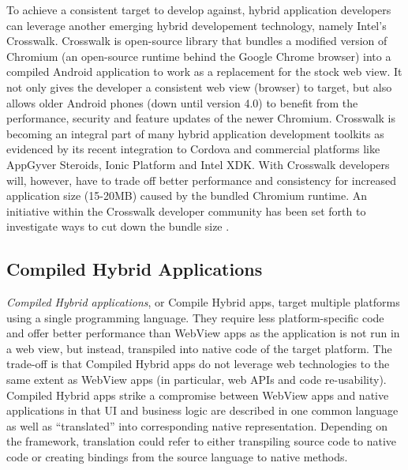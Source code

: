\documentclass[thesis.tex]{subfiles}
\begin{document}
To achieve a consistent target to develop against, hybrid application developers can leverage another emerging hybrid developement technology, namely Intel's Crosswalk. Crosswalk is open-source library that bundles a modified version of Chromium (an open-source runtime behind the Google Chrome browser) into a compiled Android application to work as a replacement for the stock web view. It not only gives the developer a consistent web view (browser) to target, but also allows older Android phones (down until version 4.0) to benefit from the performance, security and feature updates of the newer Chromium. Crosswalk is becoming an integral part of many hybrid application development toolkits as evidenced by its recent integration to Cordova and commercial platforms like AppGyver Steroids, Ionic Platform and Intel XDK. With Crosswalk developers will, however, have to trade off better performance and consistency for increased application size (15-20MB) caused by the bundled Chromium runtime. An initiative within the Crosswalk developer community has been set forth to investigate ways to cut down the bundle size \cite{crosswalk_lite}.

\subsection{Compiled Hybrid Applications}

\textit{Compiled Hybrid applications}, or Compile Hybrid apps, target multiple platforms using a single programming language. They require less platform-specific code and offer better performance than WebView apps as the application is not run in a web view, but instead, transpiled into native code of the target platform. The trade-off is that Compiled Hybrid apps do not leverage web technologies to the same extent as WebView apps (in particular, web APIs and code re-usability). Compiled Hybrid apps strike a compromise between WebView apps and native applications in that UI and business logic are described in one common language as well as ``translated'' into corresponding native representation. Depending on the framework, translation could refer to either transpiling source code to native code or creating bindings from the source language to native methods.
\end{document}
